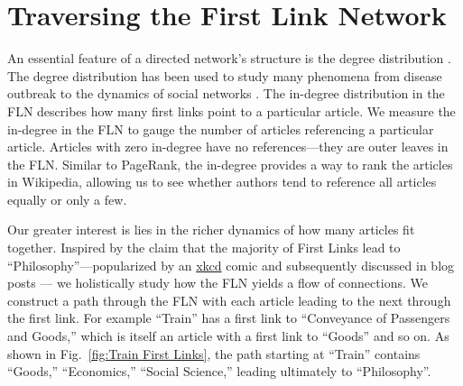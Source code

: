 \documentclass[11pt]{report}
\begin{document}
\section{Traversing the First Link Network}

An essential feature of a directed network's structure is the degree distribution 
\cite{newman}. 
The degree distribution has been used to study many phenomena from disease outbreak 
\cite{disease} 
to the dynamics of social networks 
\cite{social_nets}.
The in-degree distribution in the FLN describes how many first links point to a 
particular article. 
We measure the in-degree in the FLN to gauge the number of articles referencing a particular article.
Articles with zero in-degree have no references---they are outer leaves in the FLN. 
Similar to PageRank, the in-degree 
provides a way to rank the articles in Wikipedia, allowing us to see 
whether authors tend to reference all articles equally or only a few.

Our greater interest is lies in the richer dynamics of how many articles fit together.
Inspired by the claim that the majority of First Links lead to
``Philosophy''---popularized by an 
\href{https://xkcd.com/903/}{xkcd}
comic and subsequently
discussed in blog posts 
\cite{mat_blog, Ilmari_first_links, xkcd}
---
we holistically study how the FLN  yields a flow of connections.
We construct a path through the FLN with each article 
leading to the next through the first link. 
For example ``Train'' has a first link to ``Conveyance of Passengers and Goods,'' which is itself
an article with a first link to ``Goods'' and so on. 
As shown in Fig.~\ref{fig:Train First Links}, the path starting at ``Train'' 
contains ``Goods,'' ``Economics,'' ``Social Science,''
leading ultimately to ``Philosophy''.
\end{document}
